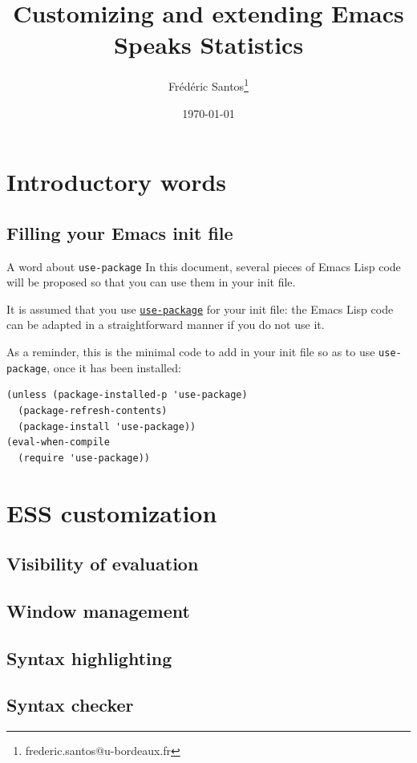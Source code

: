 \documentclass[presentation]{beamer}
\author{Frédéric Santos\thanks{frederic.santos@u-bordeaux.fr}}
\date{\today}
\title{Customizing and extending Emacs Speaks Statistics}
\begin{document}
\maketitle


\section{Introductory words}
\label{sec:org2429222}
\subsection{Filling your Emacs init file}
\label{sec:orga9ce641}
\begin{frame}[label={sec:org52751f2},fragile]{A word about \texttt{use-package}}
 In this document, several pieces of Emacs Lisp code will be proposed so that you can use them in your init file.

It is assumed that you use \href{https://jwiegley.github.io/use-package/}{\texttt{use-package}} for your init file: the Emacs Lisp code can be adapted in a straightforward manner if you do not use it.

As a reminder, this is the minimal code to add in your init file so as to use \texttt{use-package}, once it has been installed:

\begin{verbatim}
(unless (package-installed-p 'use-package)
  (package-refresh-contents)
  (package-install 'use-package))
(eval-when-compile
  (require 'use-package))
\end{verbatim}
\end{frame}

\section{ESS customization}
\label{sec:org22ba9a2}
\subsection{Visibility of evaluation}
\label{sec:org343ac42}
\subsection{Window management}
\label{sec:org68a0e2c}
\subsection{Syntax highlighting}
\label{sec:org98c7b8f}
\subsection{Syntax checker}
\label{sec:org9592424}
\end{document}
